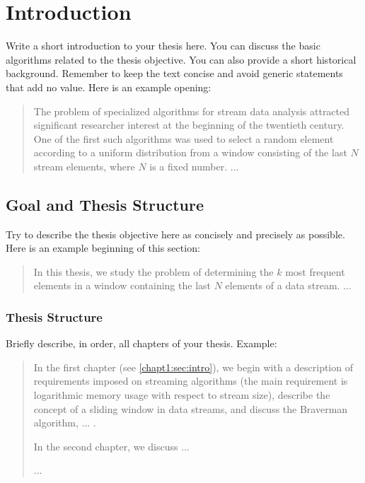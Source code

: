 \chapter{Introduction}
\label{chapt:Wstep}

Write a short introduction to your thesis here. You can discuss the basic algorithms related to the thesis objective. You can also provide a short historical background. Remember to keep the text concise and avoid generic statements that add no value.
Here is an example opening:

\begin{quote}
The problem of specialized algorithms for stream data analysis attracted significant researcher interest at the beginning of the twentieth century. One of the first such algorithms was used to select a random element according to a uniform distribution from a window consisting of the last $N$ stream elements, where $N$ is a fixed number. ...
\end{quote}


\section{Goal and Thesis Structure}

Try to describe the thesis objective here as concisely and precisely as possible. Here is an example beginning of this section:

\begin{quote}
In this thesis, we study the problem of determining the $k$ most frequent elements in a window containing the last $N$ elements of a data stream. ...
\end{quote}

\subsection*{Thesis Structure}

Briefly describe, in order, all chapters of your thesis. Example:

\begin{quote}
In the first chapter (see \ref{chapt1:sec:intro}), we begin with a description of requirements imposed on streaming algorithms (the main requirement is logarithmic memory usage with respect to stream size), describe the concept of a sliding window in data streams, and discuss the Braverman algorithm, ... .\par

In the second chapter, we discuss ... \par
...
\end{quote}

